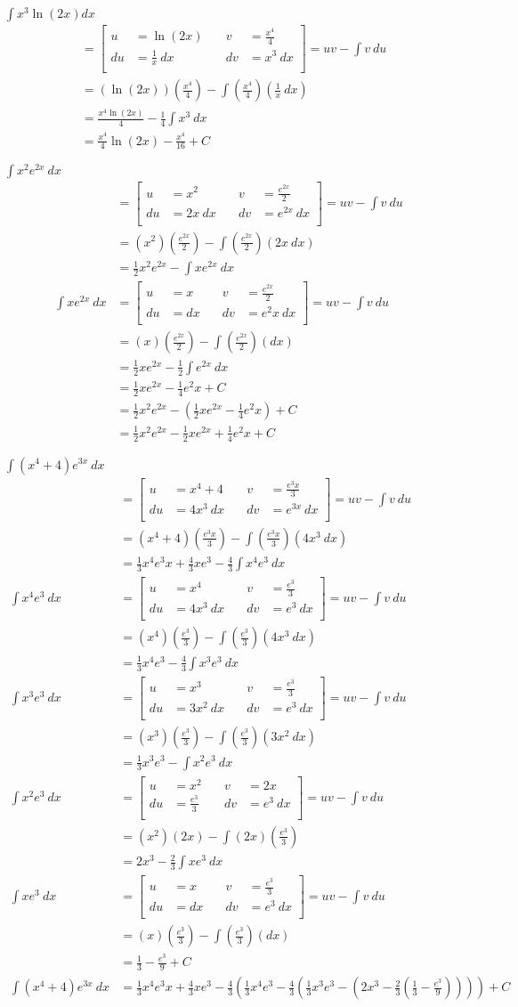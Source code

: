 \documentclass[12pt]{article}
\newenvironment{problem}[2][]{
    \begin{trivlist}
        \item[
            {\bfseries #1}
            {\bfseries #2.}
        ]
}{\end{trivlist}}
\newcommand{\setuv}[4]{
\left[
\begin{alignedat}{2}
u &= #1 &\quad v &= #2 \\
du &= #3 &\quad dv &= #4 \\
\end{alignedat}
\right]  = uv - \int v ~ du \\
&= \intbp{#1}{#2}{#3}
}
\newcommand{\intbp}[3]{\left(#1\right) \left(#2\right) - \int \left(#2\right) \left(#3\right)}
\begin{document}
\begin{problem}{21}
$\displaystyle\int x^3 \ln \left(2x\right) dx$
\begin{align}
&= \setuv{\ln \left(2x\right)}{\frac{x^4}{4}}{\frac{1}{x} ~ dx}{x^3 ~ dx} \\
&= \frac{x^4 \ln \left(2x\right)}{4} - \frac{1}{4} \int x^3 ~ dx \\
&= \frac{x^4}{4} \ln \left(2x\right) - \frac{x^4}{16} + C
\end{align}
\end{problem}

\begin{problem}{25}
$\displaystyle\int x^2e^{2x} ~ dx$
\begin{align}
&= \setuv{x^2}{\frac{e^{2x}}{2}}{2x ~ dx}{e^{2x} ~ dx} \\
&= \frac{1}{2} x^2e^{2x} - \int xe^{2x} ~ dx \\
\int xe^{2x} ~ dx &= \setuv{x}{\frac{e^{2x}}{2}}{dx}{e^2x ~ dx} \\
&= \frac{1}{2} xe^{2x} - \frac{1}{2} \int e^{2x} ~ dx \\
&= \frac{1}{2} xe^{2x} - \frac{1}{4}e^2x + C \\
&= \frac{1}{2} x^2e^{2x} - \left(\frac{1}{2} xe^{2x} - \frac{1}{4} e^2x\right) + C \\
&= \frac{1}{2} x^2e^{2x} - \frac{1}{2} xe^{2x} + \frac{1}{4} e^2x + C
\end{align}
\end{problem}

\begin{problem}{29}
$\displaystyle\int \left(x^4 + 4\right) e^{3x} ~ dx$
\begin{align}
&= \setuv{x^4 + 4}{\frac{e^3x}{3}}{4x^3 ~ dx}{e^{3x} ~ dx} \\
&= \frac{1}{3} x^4e^3x + \frac{4}{3} xe^3 - \frac{4}{3} \int x^4e^3 ~ dx \\
\int x^4e^3 ~ dx &= \setuv{x^4}{\frac{e^3}{3}}{4x^3 ~ dx}{e^3 ~ dx} \\
&= \frac{1}{3} x^4e^3 - \frac{4}{3} \int x^3 e^3 ~ dx \\
\int x^3e^3 ~ dx &= \setuv{x^3}{\frac{e^3}{3}}{3x^2 ~ dx}{e^3 ~ dx} \\
&= \frac{1}{3} x^3e^3 - \int x^2e^3 ~ dx \\
\int x^2e^3 ~ dx &= \setuv{x^2}{2x}{\frac{e^3}{3}}{e^3 ~ dx} \\
&= 2x^3 - \frac{2}{3} \int xe^3 ~ dx \\
\int xe^3 ~ dx &= \setuv{x}{\frac{e^3}{3}}{dx}{e^3 ~ dx} \\
&= \frac{1}{3} - \frac{e^3}{9} + C \\
\int \left(x^4 + 4\right) e^{3x} ~ dx &= \frac{1}{3} x^4e^3x + \frac{4}{3} xe^3 - \frac{4}{3} \left(\frac{1}{3} x^4e^3 - \frac{4}{3}\left(\frac{1}{3} x^3e^3 - \left(2x^3 - \frac{2}{3} \left(\frac{1}{3} - \frac{e^3}{9}\right)\right)\right)\right) + C
\end{align}
\end{problem}
\end{document}
